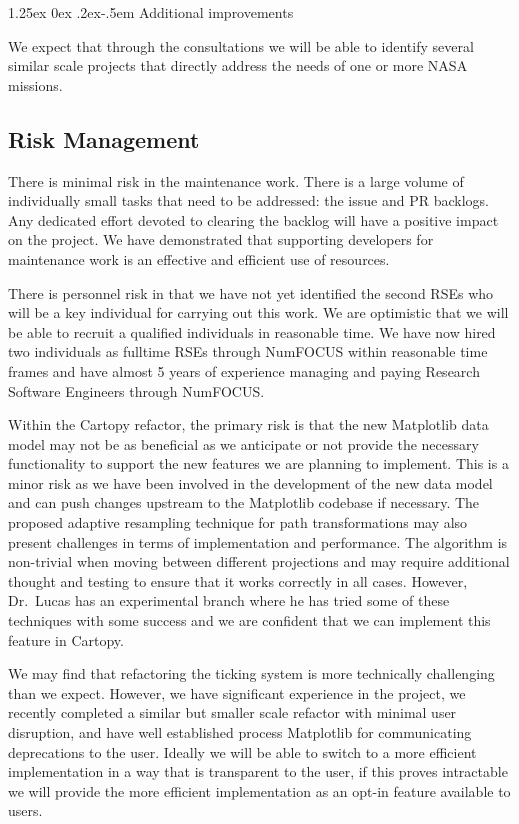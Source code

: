 \documentclass[12pt]{article}
\makeatletter
\numberwithin{page}{section}
\renewcommand{\paragraph}{%
  \@startsection{paragraph}{4}%
  {\z@}{1.25ex \@plus 0ex \@minus .2ex}{-.5em}%
  {\normalfont\normalsize\itshape\bfseries}%
}
\makeatother
\begin{document}
\paragraph{Additional improvements}

We expect that through the consultations we will be able to identify several
similar scale projects that directly address the needs of one or more NASA
missions.

\subsection{Risk Management}

There is minimal risk in the maintenance work.  There is a large volume
of individually small tasks that need to be addressed: the issue and
PR backlogs.  Any dedicated effort devoted to clearing the backlog
will have a positive impact on the project.  We have demonstrated that
supporting developers for maintenance work is an effective and
efficient use of resources.


There is personnel risk in that we have not yet identified the second RSEs who
will be a key individual for carrying out this work.  We are optimistic that we
will be able to recruit a qualified individuals in reasonable time.  We have
now hired two individuals as fulltime RSEs through NumFOCUS within reasonable
time frames and have almost 5 years of experience managing and paying
Research Software Engineers through NumFOCUS.


Within the Cartopy refactor, the primary risk is that the new Matplotlib data
model may not be as beneficial as we anticipate or not provide the necessary
functionality to support the new features we are planning to implement. This is
a minor risk as we have been involved in the development of the new data model
and can push changes upstream to the Matplotlib codebase if necessary.
The proposed adaptive resampling technique for path transformations may also
present challenges in terms of implementation and performance. The algorithm
is non-trivial when moving between different projections and may require additional
thought and testing to ensure that it works correctly in all cases.
However, Dr.\ Lucas has an experimental branch where he has tried some of these
techniques with some success and we are confident that we can implement this
feature in Cartopy.

We may find that refactoring the ticking system is more technically challenging
than we expect.  However, we have significant experience in the project, we
recently completed a similar but smaller scale refactor with minimal user
disruption, and have well established process Matplotlib for communicating
deprecations to the user.  Ideally we will be able to switch to a more
efficient implementation in a way that is transparent to the user, if this proves
intractable we will provide the more efficient implementation as an opt-in feature
available to users.
\end{document}
